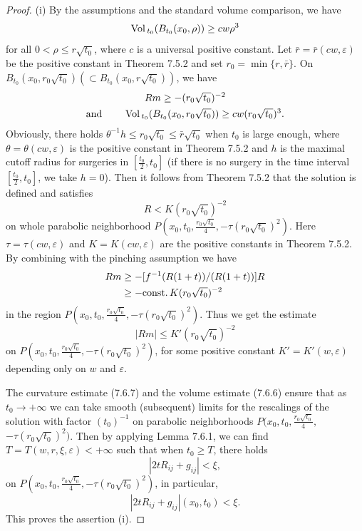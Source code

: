 \begin{proof}
(i) By the assumptions and the standard volume comparison, we have
$$
{\rm Vol}\,_{t_0}(B_{t_0}(x_0,\rho))\geq  cw \rho^3
$$
for all $0<\rho\leq r\sqrt{t_0}$, where $c$ is a universal
positive constant. Let $\bar{r}=\bar{r}(cw,\varepsilon)$ be the
positive constant in Theorem 7.5.2 and set
$r_0=\min\{r,\bar{r}\}$. On $B_{t_0}(x_0,r_0\sqrt{t_0})(\subset
B_{t_0}(x_0,r\sqrt{t_0}))$, we have
\begin{gather}
Rm\geq -(r_0\sqrt{t_0})^{-2} \\
\mbox{and }\qquad {\rm Vol}\,_{t_0}(B_{t_0}(x_0,r_0\sqrt{t_0}))\geq
cw(r_0\sqrt{t_0})^3.\nonumber
\end{gather}
Obviously, there holds $\theta^{-1}h\leq r_0\sqrt{t_0}\leq
\bar{r}\sqrt{t_0}$ when $t_0$ is large enough, where
$\theta=\theta(cw,\varepsilon)$ is the positive constant in
Theorem 7.5.2 and $h$ is the maximal cutoff radius for surgeries
in $[\frac{t_0}{2},t_0]$ (if there is no surgery in the time
interval $[\frac{t_0}{2},t_0]$, we take $h=0$). Then it follows
from Theorem 7.5.2 that the solution is defined and satisfies
$$
R<K(r_0\sqrt{t_0})^{-2}
$$
on whole parabolic neighborhood
$P(x_0,t_0,\frac{r_0\sqrt{t_0}}{4},-\tau(r_0\sqrt{t_0})^2)$. Here
$\tau=\tau(cw,\varepsilon)$ and $K=K(cw,\varepsilon)$ are the
positive constants in Theorem 7.5.2. By combining with the
pinching assumption we have
\begin{align*}
Rm&  \geq-[f^{-1}(R(1+t))/(R(1+t))]R\\
&  \geq -{\rm const.}\,K(r_0\sqrt{t_0})^{-2}
\end{align*}
in the region $P(x_0,t_0, \frac{r_0\sqrt{t_0}}{4},
-\tau(r_0\sqrt{t_0})^2)$. Thus we get the estimate \begin{equation}
|Rm|\leq K'(r_0\sqrt{t_0})^{-2} %
\end{equation} on
$P(x_0,t_0,\frac{r_0\sqrt{t_0}}{4},-\tau(r_0\sqrt{t_0})^2)$, for
some positive constant $K'=K'(w,\varepsilon)$ depending only on
$w$ and $\varepsilon$.

The curvature estimate (7.6.7) and the volume estimate (7.6.6)
ensure that as $t_0\rightarrow+\infty$ we can take smooth
(subsequent) limits for the rescalings of the solution with factor
$(t_0)^{-1}$ on parabolic neighborhoods
$P(x_0,t_0,\frac{r_0\sqrt{t_0}}{4},$ $-\tau(r_0\sqrt{t_0})^2)$.
Then by applying Lemma 7.6.1, we can find
$T=T(w,r,\xi,\varepsilon)<+\infty$ such that when $t_0\geq T$,
there holds \begin{equation}
|2tR_{ij}+g_{ij}|<\xi, %
\end{equation} on
$P(x_0,t_0,\frac{r_0\sqrt{t_0}}{4},-\tau(r_0\sqrt{t_0})^2)$, in
particular,
$$
|2tR_{ij}+g_{ij}|(x_0,t_0)<\xi.
$$
This proves the assertion (i).


\end{proof}
